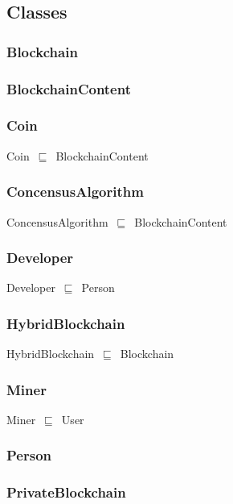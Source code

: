 \documentclass{article}
\begin{document}
\subsection*{Classes}

\subsubsection*{Blockchain}

\subsubsection*{BlockchainContent}

\subsubsection*{Coin}

Coin~\ensuremath{\sqsubseteq}~BlockchainContent~

\subsubsection*{ConcensusAlgorithm}

ConcensusAlgorithm~\ensuremath{\sqsubseteq}~BlockchainContent~

\subsubsection*{Developer}

Developer~\ensuremath{\sqsubseteq}~Person~

\subsubsection*{HybridBlockchain}

HybridBlockchain~\ensuremath{\sqsubseteq}~Blockchain~

\subsubsection*{Miner}

Miner~\ensuremath{\sqsubseteq}~User~

\subsubsection*{Person}

\subsubsection*{PrivateBlockchain}
\end{document}
